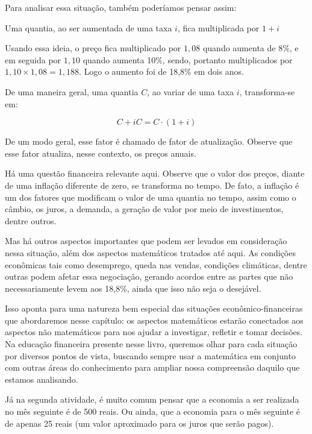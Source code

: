 Para analisar essa situação, também poderíamos pensar assim: 

\begin{description}\item[Uma quantia, ao ser aumentada de uma taxa $i$, fica multiplicada por $1+i$]

\end{description}

Usando essa ideia, o preço fica multiplicado por $1{,}08$ quando aumenta de 8\%, e em seguida por $1{,}10$ quando aumenta 10\%, sendo, portanto multiplicados por $1{,}10\times1{,}08 = 1{,}188$. Logo o aumento foi de 18,8\% em dois anos.

De uma maneira geral, uma quantia $C$, ao variar de uma taxa $i$, transforma-se em:

$$ C+iC=C\cdot(1+i) $$
\label{est1-ativ-2}

De um modo geral, esse fator é chamado de fator de atualização. Observe que esse fator atualiza, nesse contexto, os preços anuais.

Há uma questão financeira relevante aqui. Observe que o valor dos preços, diante de uma inflação diferente de zero, se transforma no tempo. De fato, a inflação é um dos fatores que modificam o valor de uma quantia no tempo, assim como o câmbio, os juros, a demanda, a geração de valor por meio de investimentos, dentre outros.

Mas há outros aspectos importantes que podem ser levados em consideração nessa situação, além dos aspectos matemáticos tratados até aqui. As condições econômicas tais como desemprego, queda nas vendas, condições climáticas, dentre outras podem afetar essa negociação, gerando acordos entre as partes que não necessariamente levem aos 18,8\%, ainda que isso não seja o desejável.

Isso aponta para uma natureza bem especial das situações econômico-financeiras que abordaremos nesse capítulo: os aspectos matemáticos estarão conectados aos aspectos não matemáticos para nos ajudar a investigar, refletir e tomar decisões. Na educação financeira presente nesse livro, queremos olhar para cada situação por diversos pontos de vista, buscando sempre usar a matemática em conjunto com outras áreas do conhecimento para ampliar nossa compreensão daquilo que estamos analisando.

Já na segunda atividade, é muito comum pensar que a economia a ser realizada no mês seguinte é de 500 reais. Ou ainda, que a economia para o mês seguinte é de apenas 25 reais (um valor aproximado para os juros que serão pagos). 


